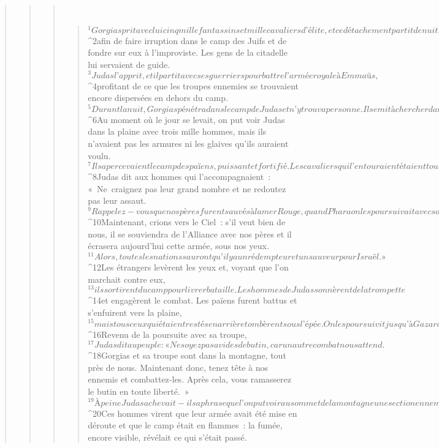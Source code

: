 \begin{verse}
\begin{verse}
\begin{verse}
         
      \bchapter{}
      \begin{verse}
${}^{1}Gorgias prit avec lui cinq mille fantassins et mille cavaliers d’élite, et ce détachement partit de nuit, 
${}^{2}afin de faire irruption dans le camp des Juifs et de fondre sur eux à l’improviste. Les gens de la citadelle lui servaient de guide. 
${}^{3}Judas l’apprit, et il partit avec ses guerriers pour battre l’armée royale à Emmaüs, 
${}^{4}profitant de ce que les troupes ennemies se trouvaient encore dispersées en dehors du camp. 
${}^{5}Durant la nuit, Gorgias pénétra dans le camp de Judas et n’y trouva personne. Il se mit à chercher dans la montagne, car il disait : « Ces gens-là fuient devant nous. »
${}^{6}Au moment où le jour se levait, on put voir Judas dans la plaine avec trois mille hommes, mais ils n’avaient pas les armures ni les glaives qu’ils auraient voulu. 
${}^{7}Ils apercevaient le camp des païens, puissant et fortifié. Les cavaliers qui l’entouraient étaient tous des gens experts au combat. 
${}^{8}Judas dit aux hommes qui l’accompagnaient : « Ne craignez pas leur grand nombre et ne redoutez pas leur assaut. 
${}^{9}Rappelez-vous que nos pères furent sauvés à la mer Rouge, quand Pharaon les poursuivait avec son armée. 
${}^{10}Maintenant, crions vers le Ciel : s’il veut bien de nous, il se souviendra de l’Alliance avec nos pères et il écrasera aujourd’hui cette armée, sous nos yeux. 
${}^{11}Alors, toutes les nations sauront qu’il y a un rédempteur et un sauveur pour Israël. » 
${}^{12}Les étrangers levèrent les yeux et, voyant que l’on marchait contre eux, 
${}^{13}ils sortirent du camp pour livrer bataille. Les hommes de Judas sonnèrent de la trompette 
${}^{14}et engagèrent le combat. Les païens furent battus et s’enfuirent vers la plaine, 
${}^{15}mais tous ceux qui étaient restés en arrière tombèrent sous l’épée. On les poursuivit jusqu’à Gazara, jusqu’aux plaines de l’Idumée, d’Azôt et de Jamnia : environ trois mille d’entre eux tombèrent. 
${}^{16}Revenu de la poursuite avec sa troupe, 
${}^{17}Judas dit au peuple : « Ne soyez pas avides de butin, car un autre combat nous attend. 
${}^{18}Gorgias et sa troupe sont dans la montagne, tout près de nous. Maintenant donc, tenez tête à nos ennemis et combattez-les. Après cela, vous ramasserez le butin en toute liberté. » 
${}^{19}À peine Judas achevait-il sa phrase que l’on put voir au sommet de la montagne une section ennemie en train de guetter. 
${}^{20}Ces hommes virent que leur armée avait été mise en déroute et que le camp était en flammes : la fumée, encore visible, révélait ce qui s’était passé. 

\end{verse}
\end{verse}
\end{verse}
\end{verse}
